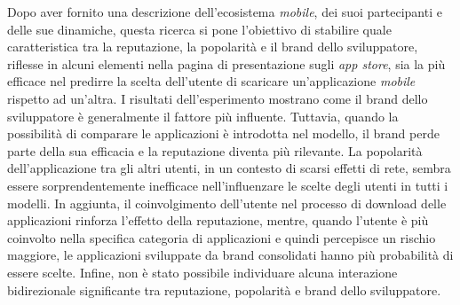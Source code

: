 Dopo aver fornito una descrizione dell'ecosistema \emph{mobile}, dei suoi partecipanti e delle sue dinamiche, questa ricerca si pone l'obiettivo di stabilire quale caratteristica tra la reputazione, la popolarità e il brand dello sviluppatore, riflesse in alcuni elementi nella pagina di presentazione sugli \emph{app store}, sia la più efficace nel predirre la scelta dell'utente di scaricare un'applicazione \emph{mobile} rispetto ad un'altra. I risultati dell'esperimento mostrano come il brand dello sviluppatore è generalmente il fattore più influente. Tuttavia, quando la possibilità di comparare le applicazioni è introdotta nel modello, il brand perde parte della sua efficacia e la reputazione diventa più rilevante. La popolarità dell'applicazione tra gli altri utenti, in un contesto di scarsi effetti di rete, sembra essere sorprendentemente inefficace nell'influenzare le scelte degli utenti in tutti i modelli. In aggiunta, il coinvolgimento dell'utente nel processo di download delle applicazioni rinforza l'effetto della reputazione, mentre, quando l'utente è più coinvolto nella specifica categoria di applicazioni e quindi percepisce un rischio maggiore, le applicazioni sviluppate da brand consolidati hanno più probabilità di essere scelte. Infine, non è stato possibile individuare alcuna interazione bidirezionale significante tra reputazione, popolarità e brand dello sviluppatore.